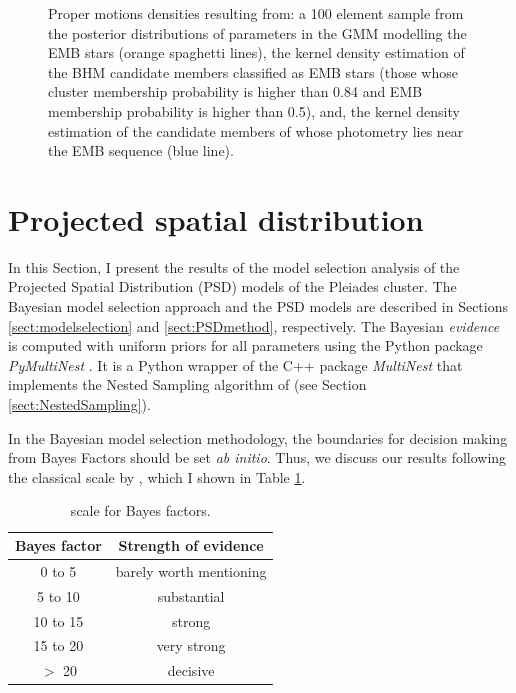 \begin{figure}[ht!]
\begin{subfigure}[t]{0.45\textwidth}
        \caption{}
    \end{subfigure}
\caption{Proper motions densities resulting from: a 100 element sample from the posterior distributions of parameters in the GMM modelling the EMB stars (orange spaghetti lines), the kernel density estimation of the BHM candidate members classified as EMB stars (those whose cluster membership probability is higher than 0.84 and EMB membership probability is higher than 0.5), and, the kernel density estimation of the candidate members of \citet{Bouy2015} whose photometry lies near the EMB sequence (blue line).}
\label{fig:PMBs}
\end{figure}

\section{Projected spatial distribution}
\label{sect:PSDresults}
In this Section, I present the results of the model selection analysis of the Projected Spatial Distribution (PSD) models of the Pleiades cluster. The Bayesian model selection approach and the PSD models are described in Sections \ref{sect:modelselection} and \ref{sect:PSDmethod}, respectively. The Bayesian \emph{evidence} is computed with uniform priors for all parameters using the Python package \emph{PyMultiNest} \citep{Buchner2014}. It is a Python wrapper of the C++ package \emph{MultiNest} \citep{Feroz2009} that implements the Nested Sampling algorithm of \citet{Skilling2004,Skilling2006} (see Section \ref{sect:NestedSampling}).

In the Bayesian model selection methodology, the boundaries for decision making from Bayes Factors should be set \emph{ab initio}. Thus, we discuss our results following the classical scale by \cite{Jeffreys61}, which I shown in Table \ref{tab:JeffreysScale}.

\begin{table}[H]
\caption{\citet{Jeffreys61} scale for Bayes factors.}
\begin{center}
\begin{tabular}{cc}
Bayes factor & Strength of evidence\\
\hline
0 to 5 & barely worth mentioning\\
5 to 10 & substantial\\
10 to 15 & strong\\
15 to 20 & very strong\\
$>$ 20 & decisive\\
\hline
\end{tabular}
\end{center}
\label{tab:JeffreysScale}
\end{table}%
 


